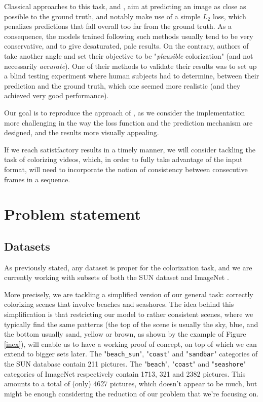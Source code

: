 \documentclass[10pt,twocolumn,letterpaper]{article}
\begin{document}
Classical approaches to this task, \eg \cite{cheng2015deep} and \cite{dahl2016tinyclouds}, aim at predicting an image as close as possible to the ground truth, and notably make use of a simple $L_2$ loss, which penalizes predictions that fall overall too far from the ground truth. As a consequence, the models trained following such methods usually tend to be very conservative, and to give desaturated, pale results.
On the contrary, authors of \cite{zhang2016colorful} take another angle and set their objective to be "\textit{plausible} colorization" (and not necessarily \textit{accurate}). One of their methods to validate their results was to set up a blind testing experiment where human subjects had to determine, between their prediction and the ground truth, which one seemed more realistic (and they achieved very good performance).

Our goal is to reproduce the approach of \cite{zhang2016colorful}, as we consider the implementation more challenging in the way the loss function and the prediction mechanism are designed, and the results more visually appealing.

If we reach satistfactory results in a timely manner, we will consider tackling the task of colorizing videos, which, in order to fully take advantage of the input format, will need to incorporate the notion of consistency between consecutive frames in a sequence.

\section{Problem statement}

\subsection{Datasets}

As previously stated, any dataset is proper for the colorization task, and we are currently working with subsets of both the SUN dataset \cite{xiao2010sun} and ImageNet \cite{russakovsky2015imagenet}.

More precisely, we are tackling a simplified version of our general task: correctly colorizing scenes that involve beaches and seashores. The idea behind this simplification is that restricting our model to rather consistent scenes, where we typically find the same patterns (the top of the scene is usually the sky, \ie blue, and the bottom usually sand, \ie yellow or brown, as shown by the example of Figure \ref{inex}), will enable us to have a working proof of concept, on top of which we can extend to bigger sets later. The "\texttt{beach\_sun}", "\texttt{coast}" and "\texttt{sandbar}" categories of the SUN database contain 211 pictures. The "\texttt{beach}", "\texttt{coast}" and "\texttt{seashore}" categories of ImageNet respectively contain 1713, 321 and 2382 pictures. This amounts to a total of (only) 4627 pictures, which doesn't appear to be much, but might be enough considering the reduction of our problem that we're focusing on.
\end{document}
